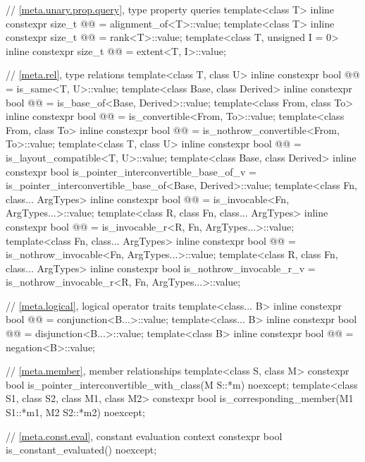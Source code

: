 \begin{codeblock}
{  // \ref{meta.unary.prop.query}, type property queries
  template<class T>
    inline constexpr size_t @@ = alignment_of<T>::value;
  template<class T>
    inline constexpr size_t @@ = rank<T>::value;
  template<class T, unsigned I = 0>
    inline constexpr size_t @@ = extent<T, I>::value;

  // \ref{meta.rel}, type relations
  template<class T, class U>
    inline constexpr bool @@ = is_same<T, U>::value;
  template<class Base, class Derived>
    inline constexpr bool @@ = is_base_of<Base, Derived>::value;
  template<class From, class To>
    inline constexpr bool @@ = is_convertible<From, To>::value;
  template<class From, class To>
    inline constexpr bool @@ = is_nothrow_convertible<From, To>::value;
  template<class T, class U>
    inline constexpr bool @@ = is_layout_compatible<T, U>::value;
  template<class Base, class Derived>
    inline constexpr bool is_pointer_interconvertible_base_of_v
      = is_pointer_interconvertible_base_of<Base, Derived>::value;
  template<class Fn, class... ArgTypes>
    inline constexpr bool @@ = is_invocable<Fn, ArgTypes...>::value;
  template<class R, class Fn, class... ArgTypes>
    inline constexpr bool @@ = is_invocable_r<R, Fn, ArgTypes...>::value;
  template<class Fn, class... ArgTypes>
    inline constexpr bool @@ = is_nothrow_invocable<Fn, ArgTypes...>::value;
  template<class R, class Fn, class... ArgTypes>
    inline constexpr bool is_nothrow_invocable_r_v
      = is_nothrow_invocable_r<R, Fn, ArgTypes...>::value;

  // \ref{meta.logical}, logical operator traits
  template<class... B>
    inline constexpr bool @@ = conjunction<B...>::value;
  template<class... B>
    inline constexpr bool @@ = disjunction<B...>::value;
  template<class B>
    inline constexpr bool @@ = negation<B>::value;

  // \ref{meta.member}, member relationships
  template<class S, class M>
    constexpr bool is_pointer_interconvertible_with_class(M S::*m) noexcept;
  template<class S1, class S2, class M1, class M2>
    constexpr bool is_corresponding_member(M1 S1::*m1, M2 S2::*m2) noexcept;

  // \ref{meta.const.eval}, constant evaluation context
  constexpr bool is_constant_evaluated() noexcept;
}
\end{codeblock}

